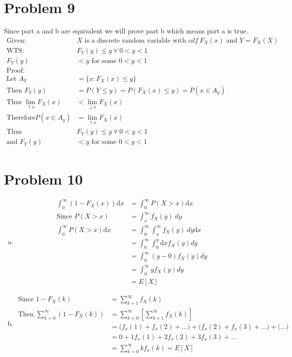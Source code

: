 \documentclass{article}
\newcommand{\dx}{\mathrm{d}x}
\begin{document}
\begin{flushleft}
\section*{Problem 9}
Since part a and b are equivalent we will prove part b which means part a is true.
\begin{align*}
\text{Given: } &X \text{ is a discrete random variable with } cdf \ F_X(x) \text{ and } Y =F_X(X)\\
\text{WTS: }& F_Y(y)\leq y \ \forall \ 0<y<1\\
F_Y(y)&<y \text{ for some } 0<y<1\\
\text{Proof: }&\\
\text{Let } A_Y&=\{x:F_X(x)\leq y\}\\
\text{Then } F_Y(y)&=P(Y\leq y)=P(F_X(x)\leq y)=P(x \in A_y)\\
\text{Thus }\lim_{\uparrow x} F_X(x)&<\lim_{\downarrow x} F_X(x)\\
\text{Therefore} P(x\in A_y)&=\lim_{\uparrow x}F_X(x)\\
\text{Thus } &F_Y(y)\leq y \ \forall \ 0<y<1\\
\text{and } F_Y(y)&<y \text{ for some } 0<y<1\\
\end{align*}
\section*{Problem 10}
\begin{enumerate}[(a)]
\item 
\begin{align*}
\int_{0}^{\infty}(1-F_X(x))\dx &=\int_{0}^{\infty}P(X>x)\dx\\
\text{Since }  P(X>x)&= \int_{x}^{\infty}f_X(y) \ dy\\
\int_{0}^{\infty}P(X>x)\dx&=\int_{0}^{\infty}\int_{x}^{\infty}f_X(y) \ dy \dx\\
&=\int_{0}^{\infty}\int_{0}^{y}\dx f_X(y) dy\\
&=\int_{0}^{\infty}(y-0)f_X(y)dy\\
&=\int_{0}^{\infty}yf_X(y)dy\\
&=E[X]
\end{align*}
\item 
\begin{align*}
\text{Since } 1-F_X(k)&=\sum_{k+1}^{\infty}f_X(k)\\
\text{Then }
\sum_{k=0}^{\infty}(1-F_X(k))&=\sum_{k=0}^{\infty}\left[\sum_{k+1}^{\infty}f_X(k)\right]\\
&=\bigg(f_x(1)+f_x(2)+\dots\bigg)+\bigg(f_x(2)+f_x(3)+\dots\bigg)+\bigg(\dots \bigg)\\
&=0+1f_x(1)+2f_x(2)+3f_x(3)+\dots\\
&=\sum_{k=0}^{\infty}kf_x(k)=E[X]
\end{align*}
\end{enumerate}
\pagebreak

\end{flushleft}
\end{document}
